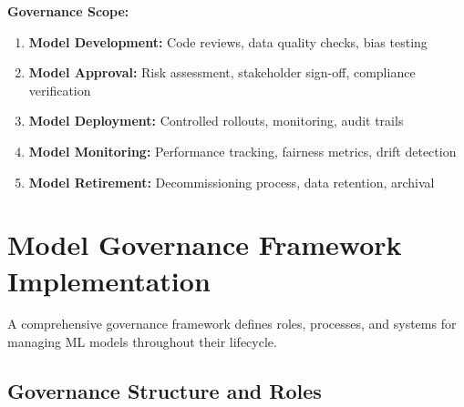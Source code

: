 \textbf{Governance Scope:}

\begin{enumerate}
    \item \textbf{Model Development:} Code reviews, data quality checks, bias testing
    \item \textbf{Model Approval:} Risk assessment, stakeholder sign-off, compliance verification
    \item \textbf{Model Deployment:} Controlled rollouts, monitoring, audit trails
    \item \textbf{Model Monitoring:} Performance tracking, fairness metrics, drift detection
    \item \textbf{Model Retirement:} Decommissioning process, data retention, archival
\end{enumerate}

\section{Model Governance Framework Implementation}

A comprehensive governance framework defines roles, processes, and systems for managing ML models throughout their lifecycle.

\subsection{Governance Structure and Roles}

